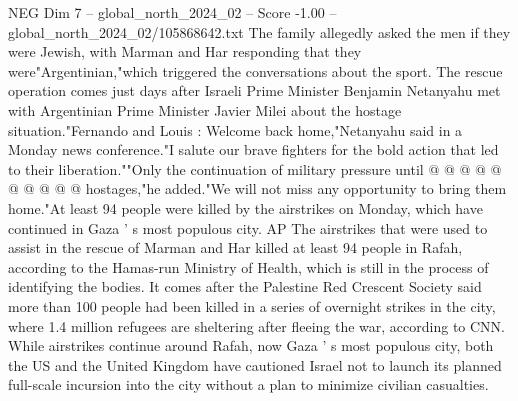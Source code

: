 \begin{textsample}{NEG Dim 7 – global\_north\_2024\_02 – Score -1.00 – global\_north\_2024\_02/105868642.txt}
The family allegedly asked the men if they were Jewish, with Marman and Har responding that they were"Argentinian,"which triggered the conversations about the sport.
The rescue operation comes just days after Israeli Prime Minister Benjamin Netanyahu met with Argentinian Prime Minister Javier Milei about the hostage situation."Fernando and Louis : Welcome back home,"Netanyahu said in a Monday news conference."I salute our brave fighters for the bold action that led to their liberation.""Only the continuation of military pressure until @ @ @ @ @ @ @ @ @ @ hostages,"he added."We will not miss any opportunity to bring them home."At least 94 people were killed by the airstrikes on Monday, which have continued in Gaza ' s most populous city.
AP The airstrikes that were used to assist in the rescue of Marman and Har killed at least 94 people in Rafah, according to the Hamas-run Ministry of Health, which is still in the process of identifying the bodies.
It comes after the Palestine Red Crescent Society said more than 100 people had been killed in a series of overnight strikes in the city, where 1.4 million refugees are sheltering after fleeing the war, according to CNN.
While airstrikes continue around Rafah, now Gaza ' s most populous city, both the US and the United Kingdom have cautioned Israel not to launch its planned full-scale incursion into the city without a plan to minimize civilian casualties.

\end{textsample}
